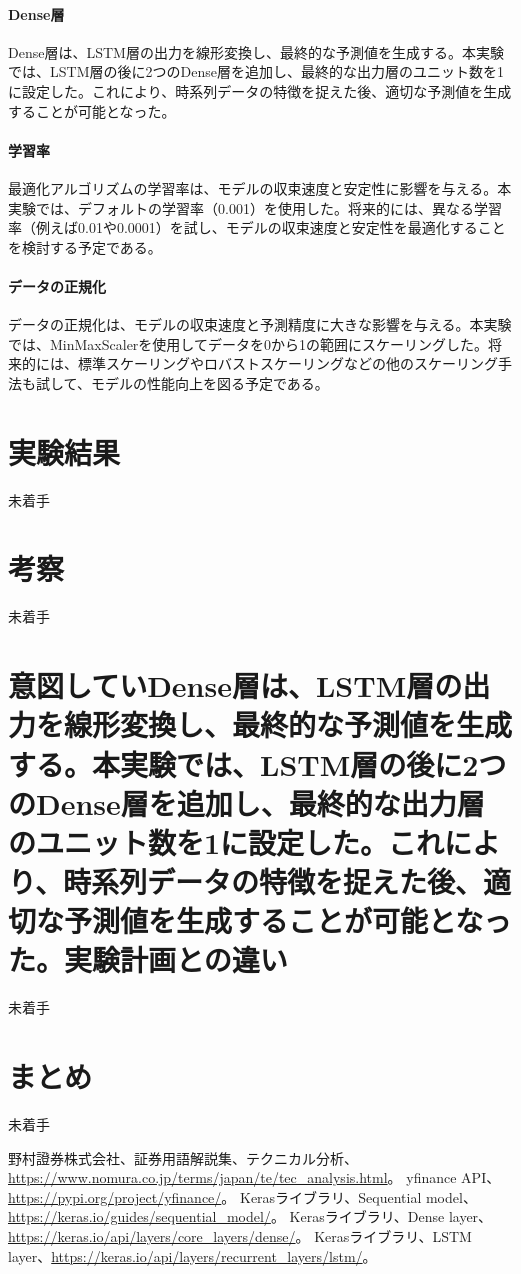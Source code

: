 \documentclass[a4paper, 11pt, titlepage]{jsarticle}
\begin{document}
\paragraph{Dense層}
\indent Dense層は、LSTM層の出力を線形変換し、最終的な予測値を生成する。本実験では、LSTM層の後に2つのDense層を追加し、最終的な出力層のユニット数を1に設定した。これにより、時系列データの特徴を捉えた後、適切な予測値を生成することが可能となった。

\paragraph{学習率}
\indent 最適化アルゴリズムの学習率は、モデルの収束速度と安定性に影響を与える。本実験では、デフォルトの学習率（0.001）を使用した。将来的には、異なる学習率（例えば0.01や0.0001）を試し、モデルの収束速度と安定性を最適化することを検討する予定である。

\paragraph{データの正規化}
\indent データの正規化は、モデルの収束速度と予測精度に大きな影響を与える。本実験では、MinMaxScalerを使用してデータを0から1の範囲にスケーリングした。将来的には、標準スケーリングやロバストスケーリングなどの他のスケーリング手法も試して、モデルの性能向上を図る予定である。

\section{実験結果}
未着手

\section{考察}
未着手

\section{意図していDense層は、LSTM層の出力を線形変換し、最終的な予測値を生成する。本実験では、LSTM層の後に2つのDense層を追加し、最終的な出力層のユニット数を1に設定した。これにより、時系列データの特徴を捉えた後、適切な予測値を生成することが可能となった。実験計画との違い}
未着手

\section{まとめ}
未着手

\begin{thebibliography}{99}
   野村證券株式会社、証券用語解説集、テクニカル分析、\url{https://www.nomura.co.jp/terms/japan/te/tec_analysis.html}。
   yfinance API、\url{https://pypi.org/project/yfinance/}。
   Kerasライブラリ、Sequential model、\url{https://keras.io/guides/sequential_model/}。
   Kerasライブラリ、Dense layer、\url{https://keras.io/api/layers/core_layers/dense/}。
   Kerasライブラリ、LSTM layer、\url{https://keras.io/api/layers/recurrent_layers/lstm/}。
  
\end{thebibliography}
\end{document}
